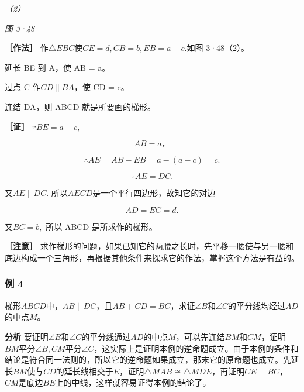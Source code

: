 \emph{（2）}

\emph{图 3·48}

\textbf{［作法］}
作\(\triangle EBC\)使\(CE = d, CB = b, EB = a - c.\)如图 3·48（2）。

延长 BE 到 A，使 AB = a。

过点 C 作\(CD \parallel BA\)，使 CD = c。

连结 DA，则 ABCD 就是所要画的梯形。

\textbf{［证］} \(\because BE = a - c,\)

\[
AB = a\text{，}
\]

\[
\therefore AE = AB - EB = a - (a - c) = c.
\]

\[
\therefore AE = DC.
\]

又\(AE \parallel DC.\) 所以\(AECD\)是一个平行四边形，故知它的对边

\[
AD = EC = d.
\]

又\(BC = b,\) 所以 ABCD 是所求作的梯形。

\textbf{［注意］}
求作梯形的问题，如果已知它的两腰之长时，先平移一腰使与另一腰和底边构成一个三角形，再根据其他条件来探求它的作法，掌握这个方法是有益的。

\subsubsection{例 4}

梯形\(ABCD\)中，\(AB \parallel DC\)，且\(AB + CD = BC\)，求证\(\angle B\)和\(\angle C\)的平分线均经过\(AD\)的中点\(M\)。

\textbf{分析}
要证明\(\angle B\)和\(\angle C\)的平分线通过\(AD\)的中点\(M\)，可以先连结\(BM\)和\(CM\)，证明\(BM\)平分\(\angle B, CM\)平分\(\angle C\)，这实际上是证明本例的逆命题成立。由于本例的条件和结论是符合同一法则的，所以它的逆命题如果成立，那末它的原命题也成立。先延长\(BM\)使与\(CD\)的延长线相交于\(E\)，证明\(\triangle MAB \cong \triangle MDE\)，再证明\(CE = BC\)，\(CM\)是底边\(BE\)上的中线，这样就容易证得本例的结论了。

